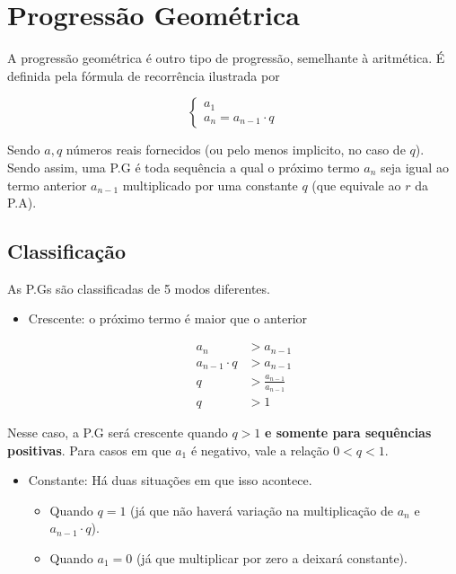 \section{Progressão Geométrica}

A progressão geométrica é outro tipo de progressão, semelhante à aritmética. É definida pela fórmula de recorrência ilustrada por

\begin{equation*}
\begin{cases}
  a_{1} \\
  a_{n} = a_{n - 1} \cdot q
\end{cases}
\end{equation*}

Sendo $a, q$ números reais fornecidos (ou pelo menos implicito, no caso de $q$). Sendo assim, uma P.G é toda sequência a qual o próximo termo $a_{n}$ seja igual ao termo anterior $a_{n - 1}$ multiplicado por uma constante $q$ (que equivale ao $r$ da P.A).

\subsection{Classificação}

As P.Gs são classificadas de 5 modos diferentes.

\begin{tcolorbox}[colback=LightYellow]

\begin{itemize}
        \item Crescente: o próximo termo é maior que o anterior


      \begin{align*}
        a_{n} &> a_{n - 1} \\
        a_{n - 1} \cdot q &> a_{n - 1} \\
        q &> \frac{a_{n - 1}}{a_{n - 1}} \\
        q &> 1
      \end{align*}
\end{itemize}

Nesse caso, a P.G será crescente quando $q > 1$ \textbf{e somente para sequências positivas}. Para casos em que $a_{1}$ é negativo, vale a relação $0 < q < 1$.
\end{tcolorbox}

\begin{tcolorbox}[colback=LightYellow]
\begin{itemize}
\item Constante: Há duas situações em que isso acontece.
      \begin{itemize}
              \item Quando $q = 1$ (já que não haverá variação na multiplicação de $a_{n}$ e $a_{n - 1}\cdot q$).
              \item Quando $a_{1} = 0$ (já que multiplicar por zero a deixará constante).
      \end{itemize}
\end{itemize}
\end{tcolorbox}

